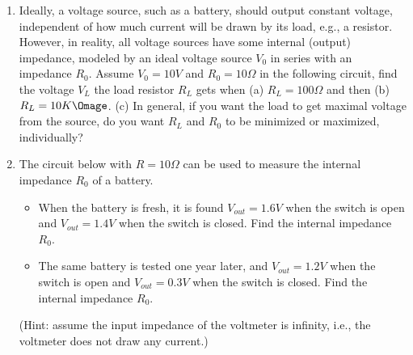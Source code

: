 \begin{enumerate}




\item Ideally, a voltage source, such as a battery, should output constant voltage,
  independent of how much current will be drawn by its load, e.g., a resistor. However, 
  in reality, all voltage sources have some internal (output) impedance, modeled by an 
  ideal voltage source $V_0$ in series with an impedance $R_0$. Assume $V_0=10V$ and 
  $R_0=10\Omega$ in the following circuit, find the voltage $V_L$ the load resistor 
  $R_L$ gets when (a) $R_L=100 \Omega$ and then (b) $R_L=10K\Omage$. 
  (c) In general, if you want the load to get maximal voltage from the source, do you 
  want $R_L$ and $R_0$ to be minimized or maximized, individually?






\item The circuit below with $R=10 \Omega$ can be used to measure the internal 
  impedance $R_0$ of a battery.
  \begin{itemize}
    \item When the battery is fresh, it is found $V_{out}=1.6V$ when the switch is open 
      and $V_{out}=1.4V$ when the switch is closed. Find the internal impedance $R_0$.
    \item The same battery is tested one year later, and $V_{out}=1.2V$ when the switch 
      is open and $V_{out}=0.3V$ when the switch is closed. Find the internal impedance 
      $R_0$.
  \end{itemize}
(Hint: assume the input impedance of the voltmeter is infinity, i.e., the voltmeter
  does not draw any current.)



\end{enumerate}
